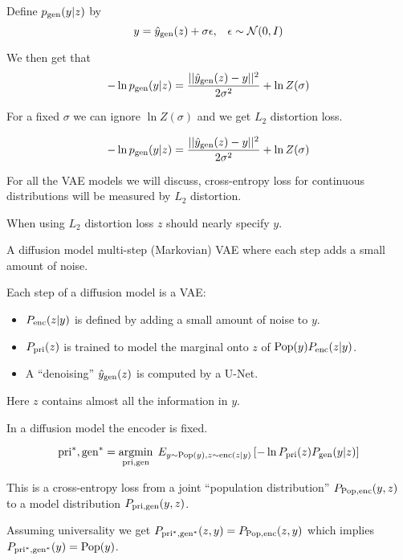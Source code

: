 {Define $p_{\mathrm{gen}}(y|z)$ by
$$y = \hat{y}_{\mathrm{gen}}(z) + \sigma\epsilon,\;\;\;\epsilon \sim {\cal N}(0,I)$$

\vfill
We then get that
$$- \ln p_{\mathrm{gen}}(y|z) = \frac{||\hat{y}_{\mathrm{gen}}(z) - y||^2}{2\sigma^2} + \ln Z(\sigma)$$

\vfill
For a fixed $\sigma$ we can ignore $\ln Z(\sigma)$ and we get $L_2$ distortion loss.


$$- \ln p_{\mathrm{gen}}(y|z) = \frac{||\hat{y}_{\mathrm{gen}}(z) - y||^2}{2\sigma^2} + \ln Z(\sigma)$$

\vfill
For all the VAE models we will discuss, cross-entropy loss for continuous distributions
will be measured by $L_2$ distortion.

\vfill
When using $L_2$ distortion loss $z$ should nearly specify $y$.


\vfill
A diffusion model multi-step (Markovian) VAE where each step adds a small amount of noise.

\vfill
Each step of a diffusion model is a VAE:

\vfill
\begin{itemize}
\item $P_{\mathrm{enc}}(z|y)$ is defined by adding a small amount of noise to $y$.

\vfill
\item $P_{\mathrm{pri}}(z)$ is trained to model the marginal onto $z$ of $\mathrm{Pop}(y)P_{\mathrm{enc}}(z|y)$.

\vfill
\item A ``denoising'' $\hat{y}_{\mathrm{gen}}(z)$ is computed by a U-Net.
\end{itemize}

\vfill
Here $z$ contains almost all the information in $y$.

In a diffusion model the encoder is fixed.

$$\mathrm{pri}^*,\mathrm{gen}^* = \operatorname*{argmin}_{\mathrm{pri},\mathrm{gen}}\;E_{y \sim \mathrm{Pop}(y),z \sim \mathrm{enc}(z|y)}\left[-\ln P_{\mathrm{pri}}(z)P_{\mathrm{gen}}(y|z)\right]$$

\vfill
This is a cross-entropy loss from a joint ``population distribution'' $P_{\mathrm{Pop},\mathrm{enc}}(y,z)$ to a model
distribution $P_{\mathrm{pri},\mathrm{gen}}(y,z)$.

\vfill
Assuming universality we get $P_{\mathrm{pri}^*,\mathrm{gen}^*}(z,y) = P_{\mathrm{Pop},\mathrm{enc}}(z,y)$ which implies {\color{red} $P_{\mathrm{pri}^*,\mathrm{gen}^*}(y) = \mathrm{Pop}(y)$}.


}
